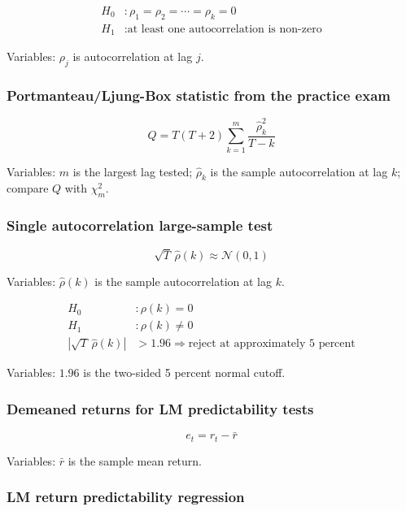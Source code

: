 \documentclass[
  8pt,
  twocolumn]{extarticle}
\begin{document}
\[
\begin{aligned}
H_0&:\rho_1=\rho_2=\cdots=\rho_k=0\\
H_1&:\text{at least one autocorrelation is non-zero}
\end{aligned}
\]

Variables: \(\rho_j\) is autocorrelation at lag \(j\).

\subsubsection{Portmanteau/Ljung-Box statistic from the practice
exam}\label{portmanteauljung-box-statistic-from-the-practice-exam}

\[
Q=T(T+2)\sum_{k=1}^{m}\frac{\hat\rho_k^2}{T-k}
\]

Variables: \(m\) is the largest lag tested; \(\hat\rho_k\) is the sample
autocorrelation at lag \(k\); compare \(Q\) with \(\chi_m^2\).

\subsubsection{Single autocorrelation large-sample
test}\label{single-autocorrelation-large-sample-test}

\[
\sqrt T\,\hat\rho(k)\approx\mathcal N(0,1)
\]

Variables: \(\hat\rho(k)\) is the sample autocorrelation at lag \(k\).

\[
\begin{aligned}
H_0&:\rho(k)=0\\
H_1&:\rho(k)\ne0\\
\left|\sqrt T\,\hat\rho(k)\right|&>1.96\Rightarrow \text{reject at approximately 5 percent}
\end{aligned}
\]

Variables: \(1.96\) is the two-sided 5 percent normal cutoff.

\subsubsection{Demeaned returns for LM predictability
tests}\label{demeaned-returns-for-lm-predictability-tests}

\[
e_t=r_t-\bar r
\]

Variables: \(\bar r\) is the sample mean return.

\subsubsection{LM return predictability
regression}\label{lm-return-predictability-regression}
\end{document}
